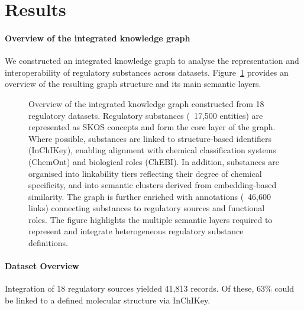 \section{Results}
\label{sec:results}

\paragraph{Overview of the integrated knowledge graph}
\label{sec:knowledge_graph}

We constructed an integrated knowledge graph to analyse the representation
and interoperability of regulatory substances across datasets.
Figure~\ref{fig:knowledge_graph} provides an overview of the resulting
graph structure and its main semantic layers.

\begin{figure}[!ht]
    \centering
    \caption{
        Overview of the integrated knowledge graph constructed from 18 regulatory datasets.
        Regulatory substances (~17,500 entities) are represented as SKOS concepts
        and form the core layer of the graph.
        Where possible, substances are linked to structure-based identifiers (InChIKey),
        enabling alignment with chemical classification systems (ChemOnt)
        and biological roles (ChEBI).
        In addition, substances are organised into linkability tiers
        reflecting their degree of chemical specificity, and into
        semantic clusters derived from embedding-based similarity.
        The graph is further enriched with annotations (~46,600 links)
        connecting substances to regulatory sources and functional roles.
        The figure highlights the multiple semantic layers
        required to represent and integrate heterogeneous regulatory substance definitions.
    }\label{fig:knowledge_graph}
\end{figure}

\paragraph{Dataset Overview}

Integration of 18 regulatory sources yielded 41,813 records. Of these,
63\% could be linked to a defined molecular structure via InChIKey.


%

